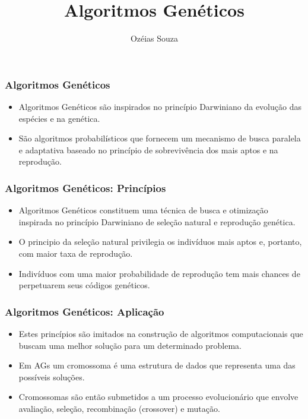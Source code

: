 \documentclass[11pt]{beamer}
\begin{document}
	\author{Ozéias Souza}
	\title{Algoritmos Genéticos}
	\begin{frame}[plain]
		\maketitle
	\end{frame}
	
	\begin{frame}
		\frametitle{Algoritmos Genéticos}
		\begin{itemize}
			\setlength\itemsep{1em}
			\item Algoritmos Genéticos são inspirados no princípio Darwiniano da evolução das espécies e na genética.
			
			\item São algoritmos probabilísticos que fornecem um mecanismo de busca paralela e adaptativa baseado no princípio de sobrevivência dos mais aptos e na reprodução.
		\end{itemize}
	\end{frame}

	\begin{frame}
		\frametitle{Algoritmos Genéticos: Princípios}
		\begin{itemize}
			\setlength\itemsep{1em}
			\item Algoritmos Genéticos constituem uma técnica de busca e otimização inspirada no princípio Darwiniano de seleção natural e reprodução genética.
			
			\item O principio da seleção natural privilegia os indivíduos mais aptos e, portanto, com maior taxa de reprodução.
			
			\item Indivíduos com uma maior probabilidade de reprodução tem mais chances de perpetuarem seus códigos genéticos.
			
		\end{itemize}
	\end{frame}

	\begin{frame}
		\frametitle{Algoritmos Genéticos: Aplicação}
		\begin{itemize}
			\setlength\itemsep{1em}
			\item Estes princípios são imitados na
			construção de algoritmos computacionais que buscam uma melhor solução para um determinado problema.
			
			\item Em AGs um cromossoma é uma estrutura de dados que representa uma das possíveis soluções.
			
			\item Cromossomas são então submetidos a um processo evolucionário que envolve avaliação, seleção, recombinação (crossover) e mutação.
												
		\end{itemize}
	\end{frame}
\end{document}
